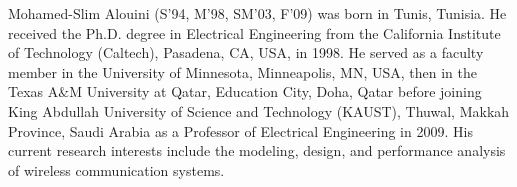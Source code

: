 \documentclass[10pt, letter, twocolumn]{IEEEtran}
\begin{document}
\begin{IEEEbiography}
{Mohamed-Slim Alouini} (S'94, M'98, SM'03, F'09) was born in Tunis, Tunisia. He received the Ph.D. degree in Electrical Engineering from the California Institute of Technology (Caltech), Pasadena, CA, USA, in 1998. He served as a faculty member in the University of Minnesota, Minneapolis, MN, USA, then in the Texas A$\&$M University at Qatar, Education City, Doha, Qatar before joining King Abdullah University of Science and Technology (KAUST), Thuwal, Makkah Province, Saudi Arabia as a Professor of Electrical Engineering in 2009. His current research interests include the modeling, design, and performance analysis of wireless communication systems.
\end{IEEEbiography}
\end{document}
